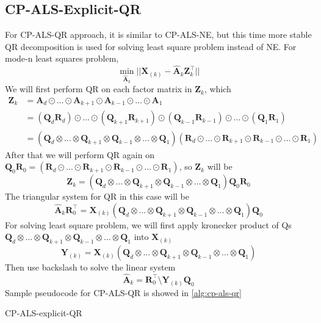 \documentclass{article}
\newcommand{\mat}[1]{\mathbf{#1}}
\begin{document}
\subsection{CP-ALS-Explicit-QR}
For CP-ALS-QR approach, it is similar to CP-ALS-NE, but this time more stable QR decomposition is used for solving least square problem instead of NE.
For mode-n least squares problem,
$$\min_{\mat{\hat{A}}_k}||\mat{X}_{(k)} - {\mat{\hat{A}}_k}\mat{Z}^\top_k ||$$
We will first perform QR on each factor matrix in $\mat{Z}_k$, which 
\begin{align}
  \mat{Z}_k &= \mat{A}_d \odot \dots \odot \mat{A}_{k+1} \odot \mat{A}_{k-1} \odot \dots \odot \mat{A}_1 \nonumber \\
  &= (\mat{Q}_d\mat{R}_d) \odot \dots \odot (\mat{Q}_{k+1}\mat{R}_{k+1}) \odot (\mat{Q}_{k-1}\mat{R}_{k-1}) \odot \dots \odot (\mat{Q}_1\mat{R}_1) \nonumber \\
  &= (\mat{Q}_d \otimes \dots \otimes \mat{Q}_{k+1} \otimes \mat{Q}_{k-1} \otimes \dots \otimes \mat{Q}_1)(\mat{R}_d \odot \dots \odot \mat{R}_{k+1} \odot \mat{R}_{k-1} \odot \dots \odot \mat{R}_1)\nonumber  
\end{align}
After that we will perform QR again on $\mat{Q}_0\mat{R}_0= (\mat{R}_d \odot \dots \odot \mat{R}_{k+1} \odot \mat{R}_{k-1} \odot \dots \odot \mat{R}_1)$, so $\mat{Z}_k$ will be
$$\mat{Z}_k = (\mat{Q}_d \otimes \dots \otimes \mat{Q}_{k+1} \otimes \mat{Q}_{k-1} \otimes \dots \otimes \mat{Q}_1)\mat{Q}_0\mat{R}_0$$
The triangular system for QR in this case will be 
\begin{equation}
  \hat{\mat{A}}_k\mat{R}_0^\top = \mat{X}_{(k)}(\mat{Q}_d \otimes \dots \otimes \mat{Q}_{k+1} \otimes \mat{Q}_{k-1} \otimes \dots \otimes \mat{Q}_1)\mat{Q}_0 
  \label{eq:CP-EXP-QR}
\end{equation}
For solving least square problem, we will first apply kronecker product of Qs $\mat{Q}_d \otimes \dots \otimes \mat{Q}_{k+1} \otimes \mat{Q}_{k-1} \otimes \dots \otimes \mat{Q}_1$ into $\mat{X}_{(k)}$
$$\mat{Y}_{(k)} = \mat{X}_{(k)}(\mat{Q}_d \otimes \dots \otimes \mat{Q}_{k+1} \otimes \mat{Q}_{k-1} \otimes \dots \otimes \mat{Q}_1)$$
Then use backslash to solve the linear system
\begin{equation}
  \hat{\mat{A}}_k = \mat{R}_0^\top \text{\textbackslash} \mat{Y}_{(k)}\mat{Q}_0
\end{equation}
Sample pseudocode for CP-ALS-QR is showed in \cref{alg:cp-als-qr}
\begin{algorithm}
  \caption{CP-ALS-explicit-QR}
  \label{alg:cp-als-qr}
  
\end{algorithm}
\end{document}
